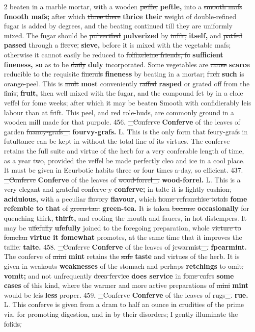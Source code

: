 \documentclass[10pt]{article}
\begin{document}
\begin{multicols}{2}
beaten in a marble mortar, with a wooden \sout{peille,} \textbf{peftle,} into a \sout{smooth mafs} \textbf{fmooth mafs;} after which \sout{three there} \textbf{thrice their} weight of double-refined fugar is added by degrees, and the beating continued till they are uniformly mixed. The fugar should be \sout{pulverified} \textbf{pulverized} by \sout{infilt,} \textbf{itself,} and \sout{patfed} \textbf{passed} through a \sout{fleeve,} \textbf{sieve,} before it is mixed with the vegetable mafs; otherwise it cannot easily be reduced to \sout{folfixcleine friends, fo} \textbf{sufficient fineness, so} as to be \sout{daily} \textbf{duly} incorporated. Some vegetables are \sout{cause} \textbf{scarce} reducible to the requisite \sout{finerals} \textbf{fineness} by beating in a mortar; \sout{fuch} \textbf{such} is orange-peel. This is \sout{molt} \textbf{most} conveniently \sout{raffed} \textbf{rasped} or grated off from the \sout{finis,} \textbf{fruit,} then well mixed with the fugar, and the compound fet by in a clole veffel for fome weeks; after which it may be beaten Smooth with confidierably leis labour than at frift. This peel, and red role-buds, are commonly ground in a wooden mill made for that purpole. 456. \sout{\_Conferve} \textbf{Conferve} of the leaves of garden \sout{fuancy-grafs\_.} \textbf{fourvy-grafs.} L. This is the only form that feury-grafs in futultance can be kept in without the total line of its virtues. The conferve retains the full suite and virtue of the herb for a very conferable length of time, as a year two, provided the veffel be made perfectly cleo and ice in a cool place. It must be given in Ecurbotic habits three or four times a-day, so efficient. 437. \sout{\_Conferve} \textbf{Conferve} of the leaves of \sout{wood-forrel\_.} \textbf{wood-forrel.} L. This is a very elegant and grateful \sout{conferve y} \textbf{conferve;} in talte it is lightly \sout{cushion,} \textbf{acidulous,} with a peculiar \sout{flavory} \textbf{flavour,} which \sout{home refranchise totals} \textbf{fome refemble to that} of \sout{green-taa.} \textbf{green-tea.} It is taken \sout{because} \textbf{occasionally} for quenching \sout{thirk,} \textbf{thirft,} and cooling the mouth and fauces, in hot distempers. It may be \sout{uifefully} \textbf{ufefully} joined to the foregoing preparation, whole \sout{victure to fomelan} \textbf{virtue it fomewhat} promotes, at the same time that it improves the \sout{taille.} \textbf{talte.} 458. \sout{\_Conferve} \textbf{Conferve} of the leaves of \sout{jewarmist\_.} \textbf{fpearmint.} The conferve of \sout{mini} \textbf{mint} retains the \sout{safe} \textbf{taste} and virtues of the herb. It is given in \sout{weakouts} \textbf{weaknesses} of the stomach and \sout{perhaps} \textbf{retchings} to \sout{omit;} \textbf{vomit;} and not unfrequently \sout{deea fervice} \textbf{does service} in \sout{fome cafes} \textbf{some cases} of this kind, where the warmer and more active preparations of \sout{mini} \textbf{mint} would be \sout{leis} \textbf{less} proper. 459. \sout{\_Conferve} \textbf{Conferve} of the leaves of \sout{rugs\_.} \textbf{rue.} L. This conferve is given from a dram to half an ounce in crudities of the prime via, for promoting digestion, and in by their disorders; I gently illuminate the \sout{folids,} 
\end{multicols}
\end{document}
